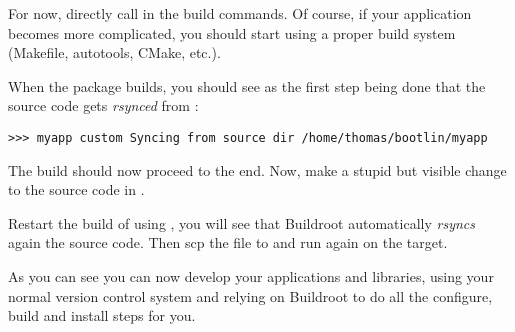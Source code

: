 For now, directly call  in the build commands. Of course, if
your application becomes more complicated, you should start using a
proper build system (Makefile, autotools, CMake, etc.).

When the package builds, you should see as the first step being done
that the  source code gets {\em rsynced} from
:

\begin{verbatim}
>>> myapp custom Syncing from source dir /home/thomas/bootlin/myapp
\end{verbatim}

The build should now proceed to the end. Now, make a stupid but
visible change to the source code in .

Restart the build of  using , you
will see that Buildroot automatically {\em rsyncs} again the source
code. Then scp the file  to
 and run  again on the target.

As you can see you can now develop your applications and libraries,
using your normal version control system and relying on Buildroot to
do all the configure, build and install steps for you.
